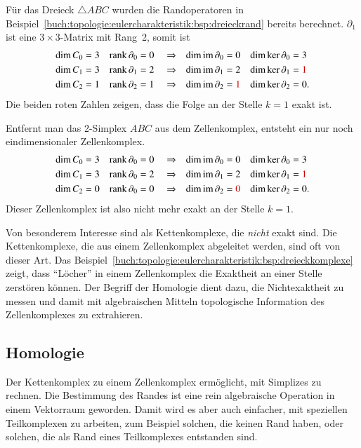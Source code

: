 \begin{beispiel}
\label{buch:topologie:eulercharakteristik:bsp:dreieckkomplexe}
Für das Dreieck $\triangle ABC$ wurden die Randoperatoren in
Beispiel~\ref{buch:topologie:eulercharakteristik:bsp:dreieckrand}
bereits berechnet.
$\partial_1$ ist eine $3\times 3$-Matrix mit Rang~2, somit ist
\begin{align*}
\dim C_0 &= 3 &
\operatorname{rank} \partial_0 &= 0&
&\Rightarrow&
\dim \operatorname{im}\partial_0 &= 0 &
\dim \ker\partial_0 &= 3
\\
\dim C_1 &= 3 &
\operatorname{rank} \partial_1 &= 2&
&\Rightarrow&
\dim \operatorname{im}\partial_1 &= 2 &
\dim \ker\partial_1 &= {\color{darkred}1}
\\
\dim C_2 &= 1 &
\operatorname{rank} \partial_2 &= 1&
&\Rightarrow&
\dim \operatorname{im}\partial_2 &= {\color{darkred}1} &
\dim \ker\partial_2 &= 0.
\end{align*}
Die beiden roten Zahlen zeigen, dass die Folge an der Stelle $k=1$
exakt ist.

Entfernt man das 2-Simplex $ABC$ aus dem Zellenkomplex, entsteht
ein nur noch eindimensionaler Zellenkomplex.
\begin{align*}
\dim C_0 &= 3 &
\operatorname{rank} \partial_0 &= 0&
&\Rightarrow&
\dim \operatorname{im}\partial_0 &= 0 &
\dim \ker\partial_0 &= 3
\\
\dim C_1 &= 3 &
\operatorname{rank} \partial_0 &= 2&
&\Rightarrow&
\dim \operatorname{im}\partial_1 &= 2 &
\dim \ker\partial_1 &= {\color{darkred}1}
\\
\dim C_2 &= 0 &
\operatorname{rank} \partial_0 &= 0&
&\Rightarrow&
\dim \operatorname{im}\partial_2 &= {\color{darkred}0} &
\dim \ker\partial_2 &= 0.
\end{align*}
Dieser Zellenkomplex ist also nicht mehr exakt an der Stelle $k=1$.
\end{beispiel}

Von besonderem Interesse sind als Kettenkomplexe, die \emph{nicht}
exakt sind.
Die Kettenkomplexe, die aus einem Zellenkomplex abgeleitet
werden, sind oft von dieser Art.
Das Beispiel~\ref{buch:topologie:eulercharakteristik:bsp:dreieckkomplexe}
zeigt, dass ``Löcher'' in einem Zellenkomplex die Exaktheit an einer 
Stelle zerstören können.
Der Begriff der Homologie dient dazu, die Nichtexaktheit zu messen und
damit mit algebraischen Mitteln topologische Information des Zellenkomplexes
zu extrahieren.

%
%
\subsection{Homologie
\label{buch:topologie:simplex:subsection:homologie}}
Der Kettenkomplex zu einem Zellenkomplex ermöglicht, mit Simplizes zu rechnen.
Die Bestimmung des Randes ist eine rein algebraische Operation
in einem Vektorraum geworden.
Damit wird es aber auch einfacher, mit speziellen Teilkomplexen
zu arbeiten, zum Beispiel solchen, die keinen Rand haben, oder solchen,
die als Rand eines Teilkomplexes entstanden sind.

